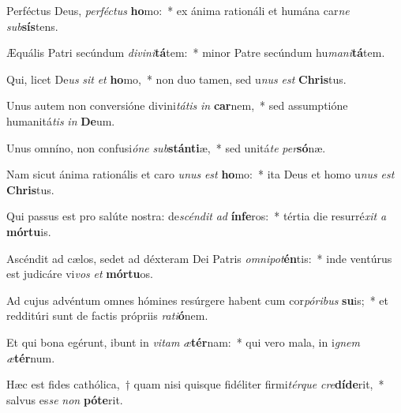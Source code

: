\item Perféctus Deus, \textit{per}\textit{féc}\textit{tus} \textbf{ho}mo:~* ex ánima rationáli et humána car\textit{ne} \textit{sub}\textbf{sís}tens.
\item Æquális Patri secúndum \textit{di}\textit{vi}\textit{ni}\textbf{tá}tem:~* minor Patre secúndum hu\textit{ma}\textit{ni}\textbf{tá}tem.
\item Qui, licet De\textit{us} \textit{sit} \textit{et} \textbf{ho}mo,~* non duo tamen, sed u\textit{nus} \textit{est} \textbf{Chris}tus.
\item Unus autem non conversióne divini\textit{tá}\textit{tis} \textit{in} \textbf{car}nem,~* sed assumptióne humanitá\textit{tis} \textit{in} \textbf{De}um.
\item Unus omníno, non confusi\textit{ó}\textit{ne} \textit{sub}\textbf{stán}\textbf{ti}æ,~* sed unitá\textit{te} \textit{per}\textbf{só}næ.
\item Nam sicut ánima rationális et caro \textit{u}\textit{nus} \textit{est} \textbf{ho}mo:~* ita Deus et homo u\textit{nus} \textit{est} \textbf{Chris}tus.
\item Qui passus est pro salúte nostra: de\textit{scén}\textit{dit} \textit{ad} \textbf{ín}\textbf{fe}ros:~* tértia die resurré\textit{xit} \textit{a} \textbf{mór}\textbf{tu}is.
\item Ascéndit ad cælos, sedet ad déxteram Dei Patris \textit{om}\textit{ni}\textit{pot}\textbf{én}tis:~* inde ventúrus est judicáre vi\textit{vos} \textit{et} \textbf{mór}\textbf{tu}os.
\item Ad cujus advéntum omnes hómines resúrgere habent cum cor\textit{pó}\textit{ri}\textit{bus} \textbf{su}is;~* et redditúri sunt de factis própriis \textit{ra}\textit{ti}\textbf{ó}nem.
\item Et qui bona egérunt, ibunt in \textit{vi}\textit{tam} \textit{æ}\textbf{tér}nam:~* qui vero mala, in i\textit{gnem} \textit{æ}\textbf{tér}num.
\item Hæc est fides cathólica,~† quam nisi quisque fidéliter firmi\textit{tér}\textit{que} \textit{cre}\textbf{dí}\textbf{de}rit,~* salvus es\textit{se} \textit{non} \textbf{pót}\textbf{e}rit.
